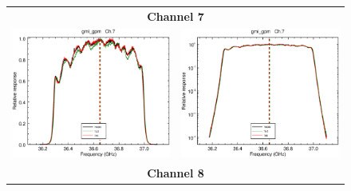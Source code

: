 \begin{figure}[H]
  \centering
  \begin{tabular}{c c}
    \multicolumn{2}{c}{\sffamily\textbf{Channel 7}}\\
    \includegraphics[scale=0.35]{graphics/lin/gmi_gpm-7.eps} &
    \includegraphics[scale=0.35]{graphics/log/gmi_gpm-7.eps} \\
    \multicolumn{2}{c}{\sffamily\textbf{Channel 8}}\\

\end{tabular}
\end{figure}

